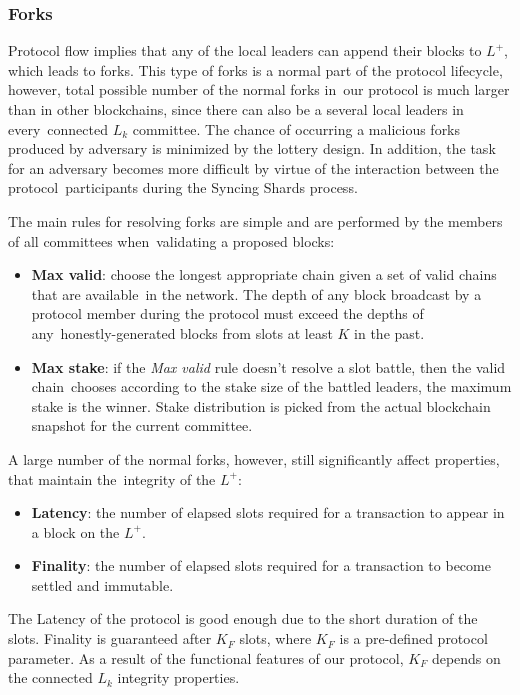 \subsubsection{Forks}\label{subsec:resolving-forks}

Protocol flow implies that any of the local leaders can append their blocks to $L^+$, which leads to forks.
This type of forks is a normal part of the protocol lifecycle, however, total possible number of the normal forks in\
our protocol is much larger than in other blockchains, since there can also be a several local leaders in every\
connected $L_k$ committee.
The chance of occurring a malicious forks produced by adversary is minimized by the lottery design.
In addition, the task for an adversary becomes more difficult by virtue of the interaction between the protocol\
participants during the Syncing Shards process.

The main rules for resolving forks are simple and are performed by the members of all committees when\
validating a proposed blocks:
\begin{itemize}
    \item \textbf{Max valid}: choose the longest appropriate chain given a set of valid chains that are available\
    in the network.
    The depth of any block broadcast by a protocol member during the protocol must exceed the depths of any\
    honestly-generated blocks from slots at least $K$ in the past.
    \item \textbf{Max stake}: if the \emph{Max valid} rule doesn't resolve a slot battle, then the valid chain\
    chooses according to the stake size of the battled leaders, the maximum stake is the winner.
    Stake distribution is picked from the actual blockchain snapshot for the current committee.
\end{itemize}

A large number of the normal forks, however, still significantly affect properties, that maintain the\
integrity of the $L^+$:
\begin{itemize}
    \item \textbf{Latency}: the number of elapsed slots required for a transaction to appear in a block on the $L^+$.
    \item \textbf{Finality}: the number of elapsed slots required for a transaction to become settled and immutable.
\end{itemize}
The Latency of the protocol is good enough due to the short duration of the slots.
Finality is guaranteed after $K_F$ slots, where $K_F$ is a pre-defined protocol parameter.
As a result of the functional features of our protocol, $K_F$ depends on the connected $L_k$ integrity properties.

